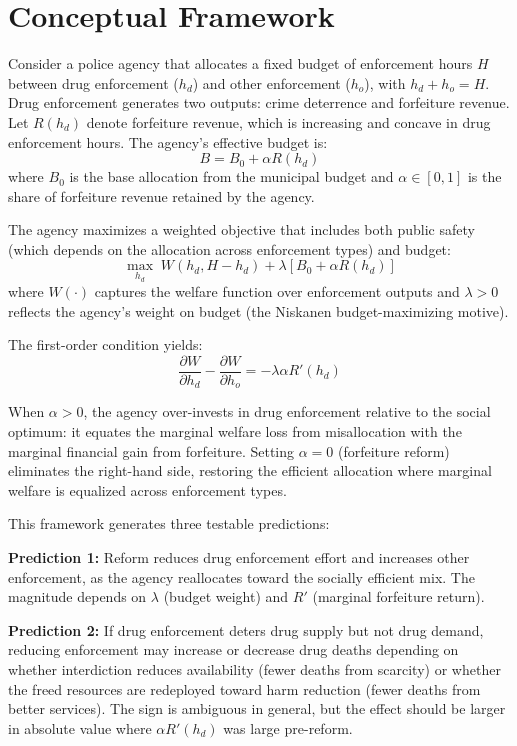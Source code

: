 \documentclass[12pt]{article}
\begin{document}
\section{Conceptual Framework}
\label{sec:framework}

Consider a police agency that allocates a fixed budget of enforcement hours $H$ between drug enforcement ($h_d$) and other enforcement ($h_o$), with $h_d + h_o = H$. Drug enforcement generates two outputs: crime deterrence and forfeiture revenue. Let $R(h_d)$ denote forfeiture revenue, which is increasing and concave in drug enforcement hours. The agency's effective budget is:
\begin{equation}
B = B_0 + \alpha R(h_d)
\end{equation}
where $B_0$ is the base allocation from the municipal budget and $\alpha \in [0,1]$ is the share of forfeiture revenue retained by the agency.

The agency maximizes a weighted objective that includes both public safety (which depends on the allocation across enforcement types) and budget:
\begin{equation}
\max_{h_d} \; W(h_d, H - h_d) + \lambda [B_0 + \alpha R(h_d)]
\end{equation}
where $W(\cdot)$ captures the welfare function over enforcement outputs and $\lambda > 0$ reflects the agency's weight on budget (the Niskanen budget-maximizing motive).

The first-order condition yields:
\begin{equation}
\frac{\partial W}{\partial h_d} - \frac{\partial W}{\partial h_o} = -\lambda \alpha R'(h_d)
\end{equation}

When $\alpha > 0$, the agency over-invests in drug enforcement relative to the social optimum: it equates the marginal welfare loss from misallocation with the marginal financial gain from forfeiture. Setting $\alpha = 0$ (forfeiture reform) eliminates the right-hand side, restoring the efficient allocation where marginal welfare is equalized across enforcement types.

This framework generates three testable predictions:

\textbf{Prediction 1:} Reform reduces drug enforcement effort and increases other enforcement, as the agency reallocates toward the socially efficient mix. The magnitude depends on $\lambda$ (budget weight) and $R'$ (marginal forfeiture return).

\textbf{Prediction 2:} If drug enforcement deters drug supply but not drug demand, reducing enforcement may increase or decrease drug deaths depending on whether interdiction reduces availability (fewer deaths from scarcity) or whether the freed resources are redeployed toward harm reduction (fewer deaths from better services). The sign is ambiguous in general, but the effect should be larger in absolute value where $\alpha R'(h_d)$ was large pre-reform.
\end{document}
